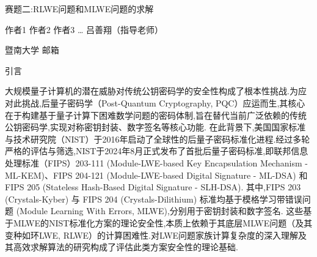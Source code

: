 \documentclass[12pt,a4paper]{article}
\newcommand{\fs}{\CJKfamily{fs}}
\numberwithin{equation}{section}
\begin{document}
\begin{center}
	{\heiti\fontsize{16pt}{24pt}\selectfont 赛题二:RLWE问题和MLWE问题的求解}
\end{center}

\begin{center}
	{\fs\fontsize{12pt}{18pt}\selectfont 作者1 作者2 作者3 … 吕善翔（指导老师）}
\end{center}

\begin{center}
	{\songti\fontsize{10.5pt}{15.75pt}\selectfont 暨南大学 \; 邮箱}
\end{center}

\vspace{1em}



\vspace{1em}


\vspace{2em}

{\centering\heiti\fontsize{16pt}{24pt}\selectfont 引言\par}
\vspace{1em}


大规模量子计算机的潜在威胁对传统公钥密码学的安全性构成了根本性挑战.为应对此挑战,后量子密码学（Post-Quantum Cryptography, PQC）应运而生,其核心在于构建基于量子计算下困难数学问题的密码体制,旨在替代当前广泛依赖的传统公钥密码学,实现对称密钥封装、数字签名等核心功能.
在此背景下,美国国家标准与技术研究院（NIST）于2016年启动了全球性的后量子密码标准化进程.经过多轮严格的评估与筛选,NIST于2024年8月正式发布了首批后量子密码标准,即联邦信息处理标准（FIPS）203-111 (Module-LWE-based Key Encapsulation Mechanism - ML-KEM)、FIPS 204-121 (Module-LWE-based Digital Signature - ML-DSA) 和 FIPS 205 (Stateless Hash-Based Digital Signature - SLH-DSA).
其中,FIPS 203 (Crystals-Kyber) 与 FIPS 204 (Crystals-Dilithium) 标准均基于模格学习带错误问题 (Module Learning With Errors, MLWE),分别用于密钥封装和数字签名.
这些基于MLWE的NIST标准化方案的理论安全性,本质上依赖于其底层MLWE问题（及其变种如环LWE, RLWE）的计算困难性.对LWE问题家族计算复杂度的深入理解及其高效求解算法的研究构成了评估此类方案安全性的理论基础.
\end{document}
